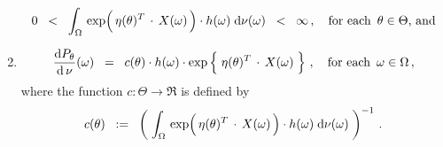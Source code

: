 \begin{definition}
\begin{enumerate}
\begin{equation*}
	0 \;\; < \;\;
		\int_{\Omega}\,
			\exp\!\left(\,\eta(\theta)^{T} \overset{{\color{white}-}}{\cdot} X(\omega)\,\right) \cdot h(\omega)
		\;\d\nu(\omega)
	\;\; < \;\; \infty\,,
	\quad
	\textnormal{for each \,$\theta \in \Theta$, and}
	\end{equation*}
\item
	\begin{equation*}
	\dfrac{\d P_{\theta}}{\d\,\nu}(\omega)
	\;\; = \;\;
		c(\theta)
		\cdot
		h(\omega)
		\cdot
		\exp\left\{\; \eta(\theta)^{T} \overset{{\color{white}-}}{\cdot} X(\omega) \;\right\}
		\,,
		\quad
		\textnormal{for each \,$\omega\in\Omega$}\,,
	\end{equation*}
	where the function $c : \Theta \longrightarrow \Re$ is defined by
	\begin{equation*}
	c(\theta)
	\;\; := \;\;
		\left(\;
			\int_{\Omega}\,
				\exp\!\left(\,\eta(\theta)^{T} \overset{{\color{white}-}}{\cdot} X(\omega)\,\right) \cdot h(\omega)
			\;\d\nu(\omega)
		\;\right)^{-1}\,.
	\end{equation*}
\end{enumerate}
\end{definition}



\renewcommand{\theenumi}{\roman{enumi}}
\renewcommand{\labelenumi}{\textnormal{(\theenumi)}$\;\;$}

